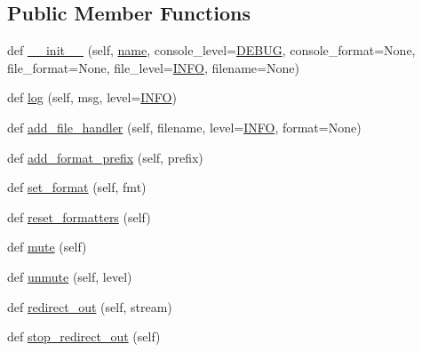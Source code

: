 \subsection*{Public Member Functions}
\begin{DoxyCompactItemize}
\item 
def \hyperlink{classparlai_1_1utils_1_1logging_1_1ParlaiLogger_ade632e1d848beb962a35797c02f51407}{\+\_\+\+\_\+init\+\_\+\+\_\+} (self, \hyperlink{namespaceparlai_1_1utils_1_1logging_a14596a213d7a65110cdb559e42d6739b}{name}, console\+\_\+level=\hyperlink{namespaceparlai_1_1utils_1_1logging_ab324194e88a7aab20579ec176d8e47ed}{D\+E\+B\+UG}, console\+\_\+format=None, file\+\_\+format=None, file\+\_\+level=\hyperlink{namespaceparlai_1_1utils_1_1logging_a4bc2de74317465e5d1a8b5d7b913d48a}{I\+N\+FO}, filename=None)
\item 
def \hyperlink{classparlai_1_1utils_1_1logging_1_1ParlaiLogger_aa545862a0e5c55d67989cc8ea7d545a1}{log} (self, msg, level=\hyperlink{namespaceparlai_1_1utils_1_1logging_a4bc2de74317465e5d1a8b5d7b913d48a}{I\+N\+FO})
\item 
def \hyperlink{classparlai_1_1utils_1_1logging_1_1ParlaiLogger_abaeed79f85f8b00792bcb3557f955e9e}{add\+\_\+file\+\_\+handler} (self, filename, level=\hyperlink{namespaceparlai_1_1utils_1_1logging_a4bc2de74317465e5d1a8b5d7b913d48a}{I\+N\+FO}, format=None)
\item 
def \hyperlink{classparlai_1_1utils_1_1logging_1_1ParlaiLogger_a160769d211d1700c2922c1ff65c83734}{add\+\_\+format\+\_\+prefix} (self, prefix)
\item 
def \hyperlink{classparlai_1_1utils_1_1logging_1_1ParlaiLogger_a1066ef97668ebb94d3204ccac1bed8f6}{set\+\_\+format} (self, fmt)
\item 
def \hyperlink{classparlai_1_1utils_1_1logging_1_1ParlaiLogger_a48e352dd5d21a2bb0637653b9bc7b354}{reset\+\_\+formatters} (self)
\item 
def \hyperlink{classparlai_1_1utils_1_1logging_1_1ParlaiLogger_a560f0cf26c3eaae2d785c4f35cae2c4b}{mute} (self)
\item 
def \hyperlink{classparlai_1_1utils_1_1logging_1_1ParlaiLogger_ad00121b486f8553c45d9ab13e81567ab}{unmute} (self, level)
\item 
def \hyperlink{classparlai_1_1utils_1_1logging_1_1ParlaiLogger_a22d5f670d10de4270b40bf3c683a9fd1}{redirect\+\_\+out} (self, stream)
\item 
def \hyperlink{classparlai_1_1utils_1_1logging_1_1ParlaiLogger_ad9b882180fc5cc0b81351f50d7fcd252}{stop\+\_\+redirect\+\_\+out} (self)
\end{DoxyCompactItemize}
